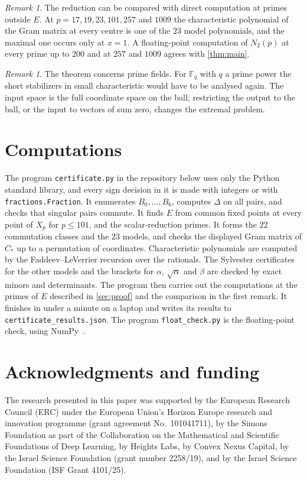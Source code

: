\documentclass[11pt,a4paper]{article}
\numberwithin{equation}{section}
\theoremstyle{remark}
\newtheorem{remark}[theorem]{Remark}
\newcommand{\F}{\mathbb F}
\begin{document}
\begin{remark}
The reduction can be compared with direct computation at primes outside $E$. At $p=17,19,23,101,257$ and $1009$ the characteristic polynomial of the Gram matrix at every centre is one of the $23$ model polynomials, and the maximal one occurs only at $x=1$. A floating-point computation of $N_2(p)$ at every prime up to $200$ and at $257$ and $1009$ agrees with \cref{thm:main}.
\end{remark}

\begin{remark}
The theorem concerns prime fields. For $\F_q$ with $q$ a prime power the short stabilizers in small characteristic would have to be analysed again. The input space is the full coordinate space on the ball; restricting the output to the ball, or the input to vectors of sum zero, changes the extremal problem.
\end{remark}

\section{Computations}\label{sec:computations}

The program \texttt{certificate.py} in the repository below uses only the Python standard library, and every sign decision in it is made with integers or with \texttt{fractions.Fraction}. It enumerates $B_0,\ldots,B_6$, computes $\Delta$ on all pairs, and checks that singular pairs commute. It finds $E$ from common fixed points at every point of $X_p$ for $p\le101$, and the scalar-reduction primes. It forms the $22$ commutation classes and the $23$ models, and checks the displayed Gram matrix of $C_*$ up to a permutation of coordinates. Characteristic polynomials are computed by the Faddeev--LeVerrier recursion over the rationals. The Sylvester certificates for the other models and the brackets for $\alpha$, $\sqrt\alpha$ and $\beta$ are checked by exact minors and determinants. The program then carries out the computations at the primes of $E$ described in \cref{sec:proof} and the comparison in the first remark. It finishes in under a minute on a laptop and writes its results to \texttt{certificate\_results.json}. The program \texttt{float\_check.py} is the floating-point check, using NumPy~\cite{NumPy}.

\section*{Acknowledgments and funding}
The research presented in this paper was supported by the European Research Council (ERC) under the European Union's Horizon Europe research and innovation programme (grant agreement No.~101041711), by the Simons Foundation as part of the Collaboration on the Mathematical and Scientific Foundations of Deep Learning, by Heights Labs, by Convex Nexus Capital, by the Israel Science Foundation (grant number 2258/19), and by the Israel Science Foundation (ISF Grant 4101/25).
\end{document}
